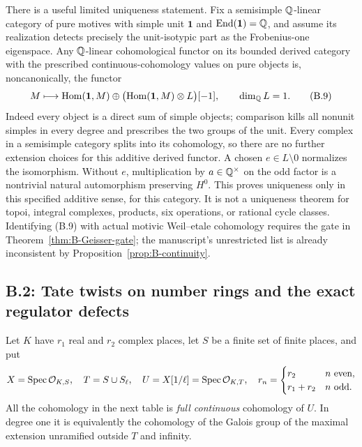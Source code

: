 





There is a useful limited uniqueness statement.  Fix a semisimple
\(\mathbb Q\)-linear category of pure motives with simple unit \(\mathbf1\)
and \(\operatorname{End}(\mathbf1)=\mathbb Q\), and assume its realization detects precisely
the unit-isotypic part as the Frobenius-one eigenspace.  Any
\(\mathbb Q\)-linear cohomological functor on its bounded derived category
with the prescribed continuous-cohomology values on pure objects is,
noncanonically, the functor
\[
 M\longmapsto\operatorname{Hom}(\mathbf1,M)\oplus
 \bigl(\operatorname{Hom}(\mathbf1,M)\otimes L\bigr)[-1],\qquad \dim_\mathbb Q L=1.
 \tag{B.9}
\]
Indeed every object is a direct sum of simple objects; comparison kills
all nonunit simples in every degree and prescribes the two groups of
the unit.  Every complex in a semisimple category splits into its
cohomology, so there are no further extension choices for this additive
derived functor.  A chosen \(e\in L\setminus0\) normalizes the
isomorphism.  Without \(e\), multiplication by \(a\in\mathbb Q^\times\) on
the odd factor is a nontrivial natural automorphism preserving \(H^0\).
This proves uniqueness only in this specified additive sense, for this
category.  It is not a uniqueness theorem for topoi, integral complexes,
products, six operations, or rational cycle classes.  Identifying (B.9)
with actual motivic Weil--etale cohomology requires the gate in
Theorem~\ref{thm:B-Geisser-gate}; the manuscript's unrestricted list is
already inconsistent by Proposition~\ref{prop:B-continuity}.

\subsection{B.2: Tate twists on number rings and the exact regulator defects}
Let \(K\) have \(r_1\) real and \(r_2\) complex places, let \(S\) be
a finite set of finite places, and put
\[
 X=\operatorname{Spec}\mathcal O_{K,S},\quad T=S\cup S_\ell,\quad
 U=X[1/\ell]=\operatorname{Spec}\mathcal O_{K,T},\quad
 r_n=\begin{cases}r_2&n\text{ even},\\r_1+r_2&n\text{ odd}.
 \end{cases}
\]
All the cohomology in the next table is \emph{full continuous}
cohomology of \(U\).  In degree one it is equivalently the cohomology
of the Galois group of the maximal extension unramified outside
\(T\) and infinity.


